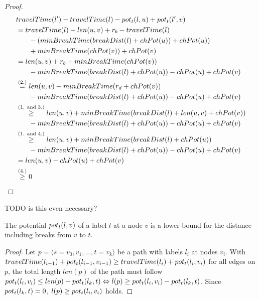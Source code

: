 \begin{proof}
	\begin{align}
		\begin{split}\label{eq:label_feasibility_proof_2}
			&\concretett(l') - \concretett(l) - \concretepotential_t(l,u) + \concretepotential_t(l',v)\\
			&= \concretett(l) + \len(u,v) + \restr_b - \concretett(l)\\
			& \phantom{{}=1} - (\minBreakTime(\breakDist(l) + \chpotential(u)) + \chpotential(u))\\
			& \phantom{{}=1} + \minBreakTime(\chpotential(v)) + \chpotential(v)\\
			&=  \len(u,v) + \restr_b + \minBreakTime(\chpotential(v))\\
			& \phantom{{}=1} - \minBreakTime(\breakDist(l)+\chpotential(u)) - \chpotential(u) + \chpotential(v)\\
			&\stackrel{\text{(2.)}}{=}  \len(u,v) + \minBreakTime(\restr_d + \chpotential(v))\\
			& \phantom{{}=1} - \minBreakTime(\breakDist(l)+\chpotential(u)) - \chpotential(u) + \chpotential(v)\\
			&\stackrel{\text{(1. and 3.)}}{\ge} \len(u,v) + \minBreakTime(\breakDist(l) + \len(u,v) + \chpotential(v))\\
			& \phantom{{}=1} - \minBreakTime(\breakDist(l)+\chpotential(u)) - \chpotential(u) + \chpotential(v)\\
			&\stackrel{\text{(1. and 4.)}}{\ge} \len(u,v) + \minBreakTime(\breakDist(l) + \chpotential(u))\\
			& \phantom{{}=1} - \minBreakTime(\breakDist(l)+\chpotential(u)) - \chpotential(u) + \chpotential(v)\\
			&=  \len(u,v) - \chpotential(u) + \chpotential(v)\\
			&\stackrel{\text{(4.)}}{\ge} 0
		\end{split}
	\end{align}
\end{proof}

TODO is this even necessary?
\begin{lemma}\label{lemma:pot_lower_bound_csp}
	The potential $pot_t(l,v)$ of a label $l$ at a node $v$ is a lower bound for the distance including breaks from $v$ to $t$.
\end{lemma}

\begin{proof}
	Let $p = \langle s=v_0,v_1,\ldots,t=v_k \rangle$ be a path with labels $l_i$ at nodes $v_i$. With $travelTime(l_{i-1}) + pot_t(l_{i-1},v_{i-1}) \ge travelTime(l_{i}) + pot_t(l_i,v_i)$ for all edges on $p$, the total length $len(p)$ of the path must follow $pot_t(l_i,v_i) \le len(p) + pot_t(l_k,t) \Leftrightarrow l(p) \ge pot_t(l_i,v_i) - pot_t(l_k,t)$. Since $pot_t(l_k,t) = 0$, $l(p) \ge pot_t(l_i,v_i)$ holds.
\end{proof}

